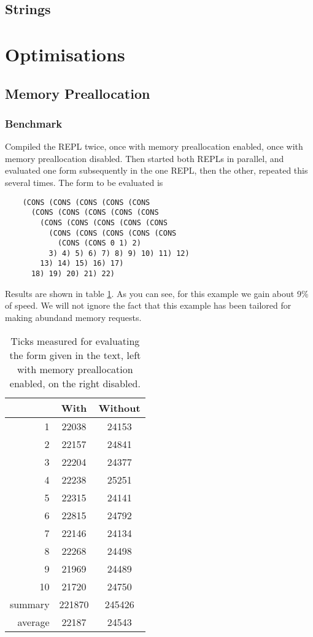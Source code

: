\documentclass[12pt]{article}
\begin{document}
\subsection{Strings}



\section{Optimisations}

\subsection{Memory Preallocation}

\subsubsection{Benchmark}


Compiled the REPL twice, once with memory preallocation enabled, once with
memory preallocation disabled.
Then started both REPLs in parallel, and evaluated one form subsequently in the
one REPL, then the other, repeated this several times.
The form to be evaluated is

\begin{verbatim}
    (CONS (CONS (CONS (CONS (CONS 
      (CONS (CONS (CONS (CONS (CONS 
        (CONS (CONS (CONS (CONS (CONS 
          (CONS (CONS (CONS (CONS (CONS 
            (CONS (CONS 0 1) 2)
          3) 4) 5) 6) 7) 8) 9) 10) 11) 12) 
        13) 14) 15) 16) 17) 
      18) 19) 20) 21) 22)
\end{verbatim}

Results are shown in table \ref{tbl:BMResultsMemPreallocation}.
As you can see, for this example we gain about 9\% of speed.
We will not ignore the fact that this example has been tailored for making
abundand memory requests.

\begin{table}
    \centering
    \begin{tabular}{r|c|c}
           & With  & Without \\
        \hline 
         1 & 22038 & 24153 \\
         2 & 22157 & 24841 \\
         3 & 22204 & 24377 \\
         4 & 22238 & 25251 \\
         5 & 22315 & 24141 \\
         6 & 22815 & 24792 \\
         7 & 22146 & 24134 \\
         8 & 22268 & 24498 \\
         9 & 21969 & 24489 \\
        10 & 21720 & 24750 \\
        \hline
        summary & 221870 & 245426 \\
        \hline
        average & 22187  & 24543
    \end{tabular}
    \caption{\label{tbl:BMResultsMemPreallocation} Ticks measured for evaluating
        the form given in the text, left with memory preallocation enabled, on
    the right disabled.}
\end{table}
\end{document}
